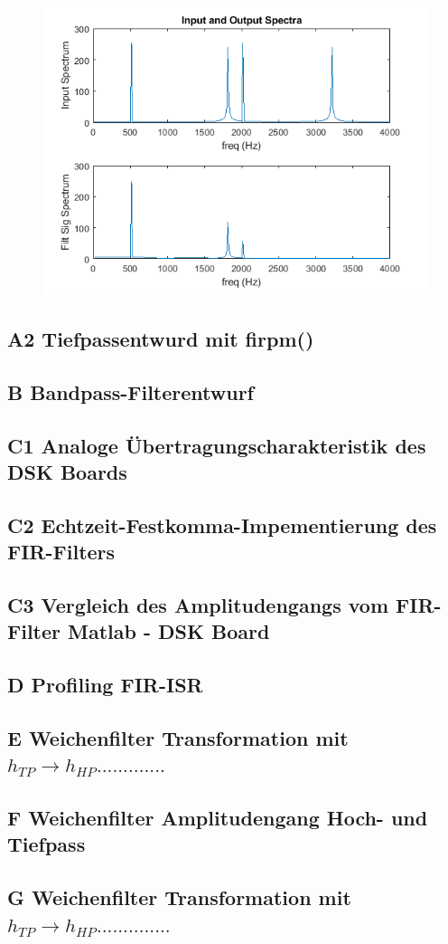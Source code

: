 \begin{figure}
\centering
\includegraphics[width=0.7\linewidth]{Bilder/Attachment_A1_fir_2a_Spektrum}
\caption{}
\label{fig:Attachment_A1_fir_2a_Spektrum}
\end{figure}


\newpage
\subsection{A2 Tiefpassentwurd mit firpm()}

\subsection{B Bandpass-Filterentwurf}

\subsection{C1 Analoge Übertragungscharakteristik des DSK Boards}

\subsection{C2 Echtzeit-Festkomma-Impementierung des FIR-Filters}


\subsection{C3 Vergleich des Amplitudengangs vom FIR-Filter Matlab - DSK Board}

\subsection{D Profiling FIR-ISR}

\subsection{E Weichenfilter Transformation mit $h_{TP} \rightarrow h_{HP} .............$}

\subsection{F Weichenfilter Amplitudengang Hoch- und Tiefpass}

\subsection{G Weichenfilter Transformation mit $h_{TP} \rightarrow h_{HP} ..............$}
 
